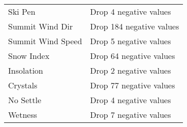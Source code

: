\begin{table}[H]
\begin{tabular}{ll}
Ski Pen & Drop 4 negative values \\
Summit Wind Dir & Drop 184 negative values \\
Summit Wind Speed & Drop 5 negative values \\
Snow Index & Drop 64 negative values \\
Insolation & Drop 2 negative values \\
Crystals & Drop 77 negative values \\
No Settle & Drop 4 negative values \\
Wetness & Drop 7 negative values \\
\bottomrule
\end{tabular}
\end{table}

